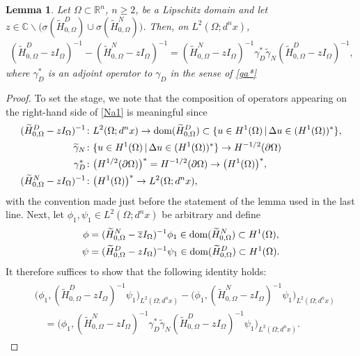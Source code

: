 \documentclass[reqno,10pt, centertags]{amsart}
\newcommand{\bbR}{{\mathbb{R}}}
\newcommand{\bbC}{{\mathbb{C}}}
\newcommand{\lb}{\label}
\newcommand{\ol}{\overline}
\newcommand{\wti}{\widetilde}
\newcommand{\ga}{\gamma}
\newcommand{\si}{\sigma}
\newcommand{\Om}{\Omega}
\newcommand{\dOm}{{\partial\Omega}}
\newcommand{\dom}{\text{\rm{dom}}}
\numberwithin{equation}{section}
\newtheorem{lemma}[theorem]{Lemma}
\theoremstyle{definition}
\begin{document}
\begin{lemma} \lb{lA.3}
Let $\Om\subset\bbR^n$, $n\geq2$, be a Lipschitz domain and let
$z\in\bbC\backslash\big(\si(\wti H^D_{0,\Om})\cup\si(\wti H^N_{0,\Om})\big)$.
Then, on $L^2(\Omega;d^nx)$,
\begin{align} \lb{Na1}
(\wti H^D_{0,\Om}-zI_\Om)^{-1} - (\wti H^N_{0,\Om}-zI_\Om)^{-1} =
(\wti H^N_{0,\Om}-zI_\Om)^{-1}\ga_D^*\wti\gamma_N (\wti
H^D_{0,\Om}-zI_\Om)^{-1},
\end{align}
where $\ga_D^*$ is an adjoint operator to $\ga_D$ in the sense of
\eqref{ga*}
\end{lemma}
\begin{proof}
To set the stage, we note that the composition of operators appearing on
the right-hand side of \eqref{Na1} is meaningful since
\begin{align}
(\wti H^D_{0,\Om}-zI_\Om)^{-1} & \colon L^2(\Om;d^nx) \to
\dom(\wti H^D_{0,\Om}) \subset \{u\in H^1(\Om)\,|\,\Delta u\in (H^1(\Om))^*\},
\\
\wti\gamma_N & \colon \{u\in H^1(\Om)\,|\,\Delta u\in (H^1(\Om))^*\}
\to H^{-1/2}(\dOm)
\\
\ga_D^* & \colon \big(H^{1/2}(\dOm)\big)^*=H^{-1/2}(\dOm)
\to \big(H^{1}(\Om)\big)^*,
\\
(\wti H^N_{0,\Om}-zI_\Om)^{-1} & \colon \big(H^{1}(\Om)\big)^* \to
L^2(\Om;d^nx),
\end{align}
with the convention made just before the statement of the lemma
used in the last line.
Next, let $\phi_1,\psi_1\in L^2(\Om;d^nx)$ be arbitrary and define
\begin{align}
\begin{split}
\phi &= (\wti H^N_{0,\Om}-\ol{z}I_\Om)^{-1}\phi_1 \in \dom(\wti H^N_{0,\Om})
\subset H^{1}(\Om),
\\
\psi &= (\wti H^D_{0,\Om}-zI_\Om)^{-1}\psi_1 \in \dom(\wti H^D_{0,\Om})
\subset H^{1}(\Om).
\end{split} \lb{Na2}
\end{align}
It therefore suffices to show that the following identity holds:
\begin{align}
\begin{split}
&\big(\phi_1,(\wti H^D_{0,\Om}-zI_\Om)^{-1}\psi_1\big)_{L^2(\Om;d^nx)} -
\big(\phi_1,(\wti H^N_{0,\Om}-zI_\Om)^{-1}\psi_1\big)_{L^2(\Om;d^nx)}
\\
&\quad = \big(\phi_1,(\wti H^N_{0,\Om}-zI_\Om)^{-1}\ga_D^*\wti\gamma_N
(\wti H^D_{0,\Om}-zI_\Om)^{-1}\psi_1\big)_{L^2(\Om;d^nx)}.

\end{split}
\end{align}
\end{proof}
\end{document}
